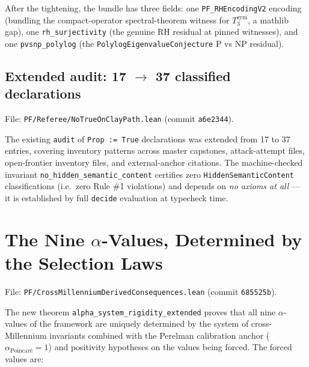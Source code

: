 After the tightening, the bundle has three fields: one
\texttt{PF\_RHEncodingV2} encoding (bundling the compact-operator
spectral-theorem witness for $T_3^{\mathrm{sym}}$, a mathlib gap),
one \texttt{rh\_surjectivity} (the genuine RH residual at pinned
witnesses), and one \texttt{pvsnp\_polylog} (the
\texttt{PolylogEigenvalueConjecture} P vs NP residual).

\subsection{Extended audit: 17 \texorpdfstring{$\to$}{->} 37 classified declarations}

File: \texttt{PF/Referee/NoTrueOnClayPath.lean} (commit \texttt{a6e2344}).

The existing \texttt{audit} of \texttt{Prop := True} declarations
was extended from 17 to 37 entries, covering inventory patterns
across master capstones, attack-attempt files, open-frontier
inventory files, and external-anchor citations. The machine-checked
invariant \texttt{no\_hidden\_semantic\_content} certifies zero
\texttt{HiddenSemanticContent} classifications (i.e.\ zero Rule \#1
violations) and depends on \emph{no axioms at all} --- it is
established by full \texttt{decide} evaluation at typecheck time.

\section{The Nine \texorpdfstring{$\alpha$}{alpha}-Values, Determined by the Selection Laws}
\label{sec:refinement-rigidity}

File: \texttt{PF/CrossMillenniumDerivedConsequences.lean}
(commit \texttt{685525b}).

The new theorem \texttt{alpha\_system\_rigidity\_extended} proves
that all nine $\alpha$-values of the framework are uniquely
determined by the system of cross-Millennium invariants combined
with the Perelman calibration anchor ($\alpha_{\text{Poincar\'e}} =
1$) and positivity hypotheses on the values being forced. The
forced values are:

